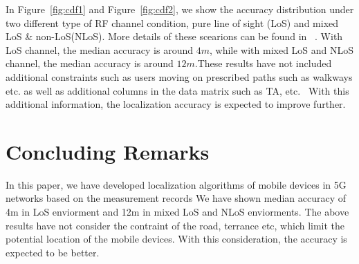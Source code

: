 \documentclass[conference, 10pt]{IEEEtran}
\begin{document}
In Figure~\ref{fig:cdf1} and Figure~\ref{fig:cdf2}, we show the
accuracy distribution under two different type of RF channel condition, pure line of sight (LoS) and mixed LoS \& non-LoS(NLoS). More details of these scearions can be found in 
~\cite{3gpp38901}. With LoS channel, the median accuracy is around
$4m$, while with mixed LoS and NLoS channel, the median accuracy is around $12m$.These results have not included additional constraints such as users moving on prescribed paths such as walkways etc. as well as additional columns in the data matrix such as TA, etc. 
With this additional information, the localization accuracy is expected to improve further.

\section{Concluding Remarks}
\label{sec:concl}

In this paper, we have developed localization algorithms of mobile devices in 5G networks based on the measurement records 
We have shown median accuracy of 4m in LoS enviorment and 12m in mixed LoS and NLoS enviorments. 
The above results have not consider the contraint of the road, terrance etc, which limit the potential location of the mobile devices. With this consideration,
the accuracy is expected to be better.  




%
%    

{%


}
\end{document}
